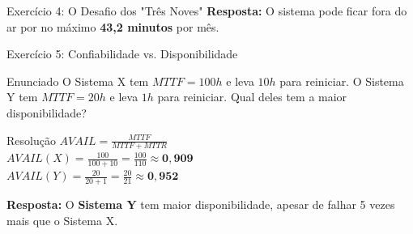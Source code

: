 \documentclass[9pt]{beamer}
\begin{document}
\begin{frame}{Exercício 4: O Desafio dos "Três Noves"}
    \textbf{Resposta:} O sistema pode ficar fora do ar por no máximo \textbf{43,2 minutos} por mês.
\end{frame}\begin{frame}{Exercício 5: Confiabilidade vs. Disponibilidade}
    \begin{block}{Enunciado}
        O Sistema X tem $MTTF = 100h$ e leva $10h$ para reiniciar. O Sistema Y tem $MTTF = 20h$ e leva $1h$ para reiniciar. Qual deles tem a maior disponibilidade?
    \end{block}

    \pause
    \begin{exampleblock}{Resolução}
        $AVAIL = \frac{MTTF}{MTTF + MTTR}$ \\
        \vspace{0.2cm}
        $AVAIL(X) = \frac{100}{100+10} = \frac{100}{110} \approx \mathbf{0,909}$ \\
        $AVAIL(Y) = \frac{20}{20+1} = \frac{20}{21} \approx \mathbf{0,952}$
    \end{exampleblock}

    \textbf{Resposta:} O \textbf{Sistema Y} tem maior disponibilidade, apesar de falhar 5 vezes mais que o Sistema X.
\end{frame}
\end{document}
